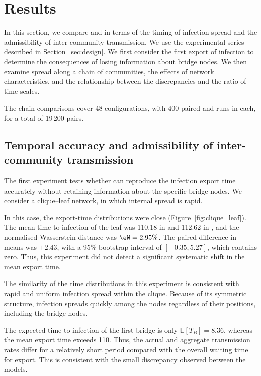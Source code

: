 \section{Results}
\label{sec:results}

In this section, we compare \Full{} and \TS{} in terms of the timing of infection spread and the admissibility of inter-community transmission. We use the experimental series described in Section~\ref{sec:design}. We first consider the first export of infection to determine the consequences of losing information about bridge nodes. We then examine spread along a chain of communities, the effects of network characteristics, and the relationship between the discrepancies and the ratio of time scales.

The chain comparisons cover 48 configurations, with 400 paired \Full{} and \TS{} runs in each, for a total of 19\,200 pairs.


\subsection{Temporal accuracy and admissibility of inter-community transmission}
\label{sec:res_clique}

The first experiment tests whether \TS{} can reproduce the infection export time accurately without retaining information about the specific bridge nodes. We consider a clique--leaf network, in which internal spread is rapid.

In this case, the export-time distributions were close (Figure~\ref{fig:clique_leaf}). The mean time to infection of the leaf was 110.18 in \Full{} and 112.62 in \TS{}, and the normalised Wasserstein distance was $\eW=2.95\%$. The paired difference in means was $+2.43$, with a 95\% bootstrap interval of $[-0.35,5.27]$, which contains zero. Thus, this experiment did not detect a significant systematic shift in the mean export time.

The similarity of the time distributions in this experiment is consistent with rapid and uniform infection spread within the clique. Because of its symmetric structure, infection spreads quickly among the nodes regardless of their positions, including the bridge nodes.

The expected time to infection of the first bridge is only $\mathbb{E}[T_B]=8.36$, whereas the mean export time exceeds 110. Thus, the actual and aggregate transmission rates differ for a relatively short period compared with the overall waiting time for export. This is consistent with the small discrepancy observed between the models.

